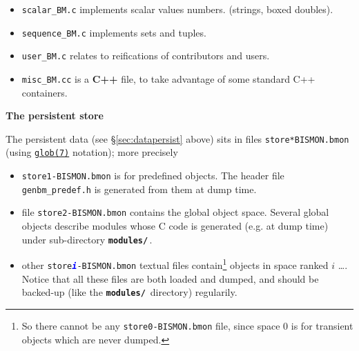 \begin{appendices}
\begin{itemize}
  \item \texttt{scalar\_BM.c} implements scalar values
      
    numbers.  (strings,
    boxed doubles).

  \item \texttt{sequence\_BM.c} implements sets and
    tuples.

  \item \texttt{user\_BM.c} relates
     to reifications of
    contributors and  users.

  \item \texttt{misc\_BM.cc} is a \textbf{C++} file,
     to take advantage of
    some standard C++   containers.
\end{itemize}

{\large \textbf{The persistent store}}

The persistent data (see \S \ref{sec:datapersist} above) sits in files
 
 \texttt{store*BISMON.bmon}
(using
\href{https://man7.org/linux/man-pages/man7/glob.7.html}{\texttt{glob(7)}}
notation); more precisely

\begin{itemize}

\item \texttt{store{1}-BISMON.bmon} is for predefined objects. The header file
  \texttt{genbm\_predef.h} is generated from them at dump time.

\item file \texttt{store{2}-BISMON.bmon} contains the global object space. Several
  global objects describe modules whose C code is generated (e.g. at
  dump time)   under sub-directory
  \textbf{\texttt{modules/}}\,.

\item other \texttt{store\textcolor{blue}{\textbf{\textit{i}}}-BISMON.bmon}
  textual files contain\footnote{So there cannot be any
    \texttt{store{0}-BISMON.bmon} file, since space 0 is for transient objects
    which are never dumped.}  objects in space ranked $i$ \ldots. Notice
  that all these files are both loaded and dumped, and should be
  backed-up (like the \textbf{\texttt{modules/}}\, directory)
  regularily.


\end{itemize}
\end{appendices}
